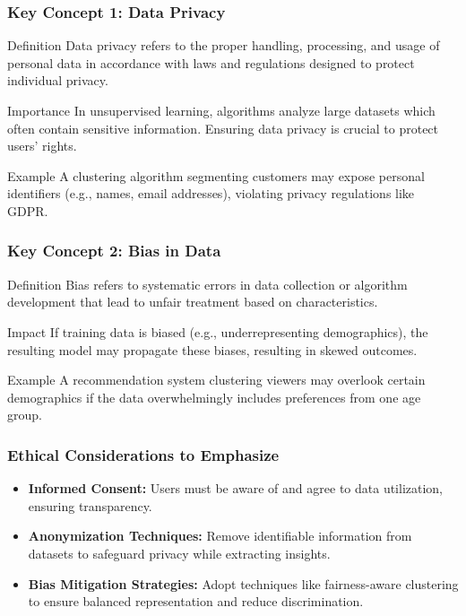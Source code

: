 \documentclass[aspectratio=169]{beamer}
\begin{document}
\begin{frame}[fragile]
    \frametitle{Key Concept 1: Data Privacy}
    \begin{block}{Definition}
        Data privacy refers to the proper handling, processing, and usage of personal data in accordance with laws and regulations designed to protect individual privacy.
    \end{block}
    \begin{block}{Importance}
        In unsupervised learning, algorithms analyze large datasets which often contain sensitive information. Ensuring data privacy is crucial to protect users’ rights.
    \end{block}
    \begin{exampleblock}{Example}
        A clustering algorithm segmenting customers may expose personal identifiers (e.g., names, email addresses), violating privacy regulations like GDPR.
    \end{exampleblock}
\end{frame}

\begin{frame}[fragile]
    \frametitle{Key Concept 2: Bias in Data}
    \begin{block}{Definition}
        Bias refers to systematic errors in data collection or algorithm development that lead to unfair treatment based on characteristics.
    \end{block}
    \begin{block}{Impact}
        If training data is biased (e.g., underrepresenting demographics), the resulting model may propagate these biases, resulting in skewed outcomes.
    \end{block}
    \begin{exampleblock}{Example}
        A recommendation system clustering viewers may overlook certain demographics if the data overwhelmingly includes preferences from one age group.
    \end{exampleblock}
\end{frame}

\begin{frame}[fragile]
    \frametitle{Ethical Considerations to Emphasize}
    \begin{itemize}
        \item \textbf{Informed Consent:} Users must be aware of and agree to data utilization, ensuring transparency.
        \item \textbf{Anonymization Techniques:} Remove identifiable information from datasets to safeguard privacy while extracting insights.
        \item \textbf{Bias Mitigation Strategies:} Adopt techniques like fairness-aware clustering to ensure balanced representation and reduce discrimination.
    \end{itemize}
\end{frame}
\end{document}
